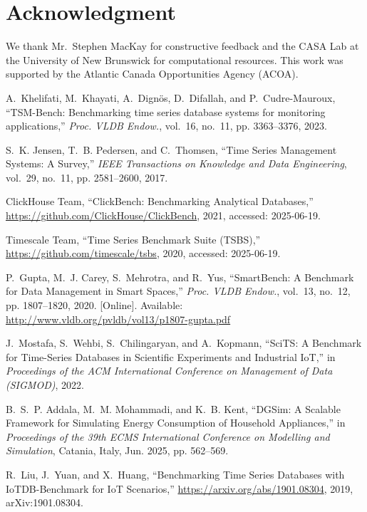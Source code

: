 \documentclass[conference]{IEEEtran}
\begin{document}
\section*{Acknowledgment}
We thank Mr.~Stephen MacKay for constructive feedback and the CASA Lab at the University of New Brunswick for computational resources. This work was supported by the Atlantic Canada Opportunities Agency (ACOA).

\begin{thebibliography}{00}

A.~Khelifati, M.~Khayati, A.~Dignös, D.~Difallah, and P.~Cudre-Mauroux, ``{TSM-Bench}: Benchmarking time series database systems for monitoring applications,'' \emph{Proc. VLDB Endow.}, vol.~16, no.~11, pp. 3363--3376, 2023.

S.~K. Jensen, T.~B. Pedersen, and C.~Thomsen, ``{Time Series Management Systems: A Survey},'' \emph{IEEE Transactions on Knowledge and Data Engineering}, vol.~29, no.~11, pp. 2581--2600, 2017.

{ClickHouse Team}, ``{ClickBench: Benchmarking Analytical Databases},'' \url{https://github.com/ClickHouse/ClickBench}, 2021, accessed: 2025-06-19.

{Timescale Team}, ``{Time Series Benchmark Suite (TSBS)},'' \url{https://github.com/timescale/tsbs}, 2020, accessed: 2025-06-19.

P.~Gupta, M.~J. Carey, S.~Mehrotra, and R.~Yus, ``{SmartBench: A Benchmark for Data Management in Smart Spaces},'' \emph{Proc. VLDB Endow.}, vol.~13, no.~12, pp. 1807--1820, 2020. [Online]. Available: \url{http://www.vldb.org/pvldb/vol13/p1807-gupta.pdf}

J.~Mostafa, S.~Wehbi, S.~Chilingaryan, and A.~Kopmann, ``{SciTS: A Benchmark for Time-Series Databases in Scientific Experiments and Industrial IoT},'' in \emph{Proceedings of the ACM International Conference on Management of Data (SIGMOD)}, 2022.

B.~S.~P. Addala, M.~M. Mohammadi, and K.~B. Kent, ``{DGSim: A Scalable Framework for Simulating Energy Consumption of Household Appliances},'' in \emph{Proceedings of the 39th ECMS International Conference on Modelling and Simulation}, Catania, Italy, Jun. 2025, pp. 562--569.

R.~Liu, J.~Yuan, and X.~Huang, ``{Benchmarking Time Series Databases with IoTDB-Benchmark for IoT Scenarios},'' \url{https://arxiv.org/abs/1901.08304}, 2019, arXiv:1901.08304.


\end{thebibliography}
\end{document}
